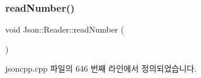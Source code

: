 \mbox{\label{class_json_1_1_reader_afb31bfda6bb27d6453057a47655e8363}} 
\subsubsection{\texorpdfstring{read\+Number()}{readNumber()}}
{\footnotesize\ttfamily void Json\+::\+Reader\+::read\+Number (\begin{DoxyParamCaption}{ }\end{DoxyParamCaption})\hspace{0.3cm}{\ttfamily [private]}}



jsoncpp.\+cpp 파일의 646 번째 라인에서 정의되었습니다.


